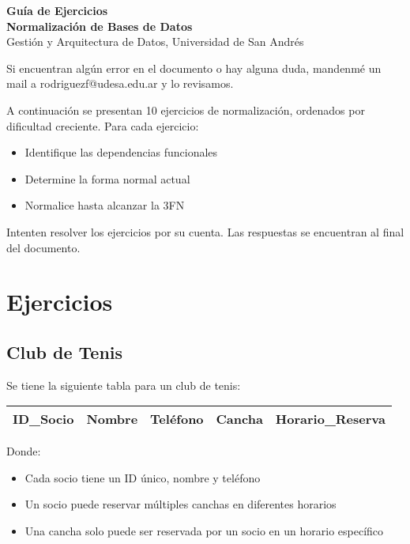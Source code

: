 \documentclass[12pt]{article}
\begin{document}
\begin{center}
  {\LARGE \textbf{Guía de Ejercicios \\ Normalización de Bases de Datos}}\\[0.5em]
  {Gestión y Arquitectura de Datos, Universidad de San Andrés}
\end{center}

Si encuentran algún error en el documento o hay alguna duda, mandenmé un mail a rodriguezf@udesa.edu.ar y lo revisamos.

\vspace{0.5em}

A continuación se presentan 10 ejercicios de normalización, ordenados por dificultad creciente. Para cada ejercicio:
\begin{itemize}
    \item Identifique las dependencias funcionales
    \item Determine la forma normal actual
    \item Normalice hasta alcanzar la 3FN
\end{itemize}

Intenten resolver los ejercicios por su cuenta. Las respuestas se encuentran al final del documento.

\section{Ejercicios}

\subsection{Club de Tenis}
Se tiene la siguiente tabla para un club de tenis:
\vspace{0.5em}
\begin{center}
\begin{tabular}{|l|l|l|l|l|}
\hline
ID\_Socio & Nombre & Teléfono & Cancha & Horario\_Reserva \\
\hline
\end{tabular}
\end{center}

Donde:
\begin{itemize}
    \item Cada socio tiene un ID único, nombre y teléfono
    \item Un socio puede reservar múltiples canchas en diferentes horarios
    \item Una cancha solo puede ser reservada por un socio en un horario específico
\end{itemize}
\end{document}
